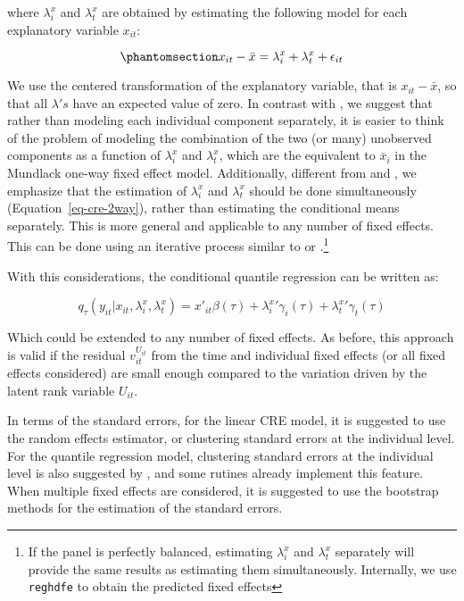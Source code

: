 \documentclass[bib]{statapress}
\begin{document}
where \(\lambda_i^x\) and \(\lambda_t^x\) are obtained by estimating the
following model for each explanatory variable \(x_{it}\):

\begin{equation}\phantomsection\label{eq-cre-2way}{x_{it} -\bar x = \lambda_i^x + \lambda_t^x + \epsilon_{it}
}\end{equation}

We use the centered transformation of the explanatory variable, that is
\(x_{it}-\bar x\), so that all \(\lambda's\) have an expected value of
zero. In contrast with \citet{baltagi2023}, we suggest that rather than
modeling each individual component separately, it is easier to think of
the problem of modeling the combination of the two (or many) unobserved
components as a function of \(\lambda_i^x\) and \(\lambda_t^x\), which
are the equivalent to \(\bar x_i\) in the Mundlack one-way fixed effect
model. Additionally, different from \citet{wooldridge2021} and
\citet{baltagi2023}, we emphasize that the estimation of \(\lambda_i^x\)
and \(\lambda_t^x\) should be done simultaneously
(Equation~\ref{eq-cre-2way}), rather than estimating the conditional
means separately. This is more general and applicable to any number of
fixed effects. This can be done using an iterative process similar to
\citet{rios2015} or \citet{correia_feasible_nodate}.\footnote{If the
  panel is perfectly balanced, estimating \(\lambda_i^x\) and
  \(\lambda_t^x\) separately will provide the same results as estimating
  them simultaneously. Internally, we use
  \citet{correia_feasible_nodate} \texttt{reghdfe} to obtain the
  predicted fixed effects}

With this considerations, the conditional quantile regression can be
written as:

\[q_\tau(y_{it}|x_{it},\lambda_i^x,\lambda_t^x)=x'_{it}\beta(\tau)+{\lambda^x_i}'\gamma_i(\tau)
+{\lambda^x_t}'\gamma_t(\tau)  
\]

Which could be extended to any number of fixed effects. As before, this
approach is valid if the residual \(v^{U_{it}}_{it}\) from the time and
individual fixed effects (or all fixed effects considered) are small
enough compared to the variation driven by the latent rank variable
\(U_{it}\).

In terms of the standard errors, for the linear CRE model, it is
suggested to use the random effects estimator, or clustering standard
errors at the individual level. For the quantile regression model,
clustering standard errors at the individual level is also suggested by
\citet{wooldridge2010}, and some rutines already implement this feature.
When multiple fixed effects are considered, it is suggested to use the
bootstrap methods for the estimation of the standard errors.
\end{document}
